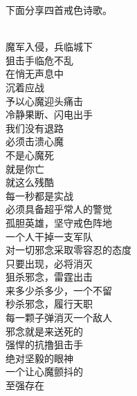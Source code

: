 下面分享四首戒色诗歌。

\begin{poem}[抗撸狙击手]
    \begin{multicols}{3}
        \centering~\\
        魔军入侵，兵临城下 \\ 狙击手临危不乱 \\ 在悄无声息中 \\ 沉着应战 \\ 予以心魔迎头痛击 \\ 冷静果断、闪电出手 \\ 我们没有退路 \\ 必须击溃心魔 \\ 不是心魔死 \\ 就是你亡 \\ 就这么残酷 \\ 每一秒都是实战 \\ 必须具备超乎常人的警觉 \\ 孤胆英雄，坚守戒色阵地 \\ 一个人干掉一支军队 \\ 对一切邪念采取零容忍的态度 \\ 只要出现，必将消灭 \\ 狙杀邪念，雷霆出击 \\ 来多少杀多少，一个不留 \\ 秒杀邪念，履行天职 \\ 每一颗子弹消灭一个敌人 \\ 邪念就是来送死的 \\ 强悍的抗撸狙击手 \\ 绝对坚毅的眼神 \\ 一个让心魔颤抖的 \\ 至强存在
    \end{multicols}
\end{poem}

